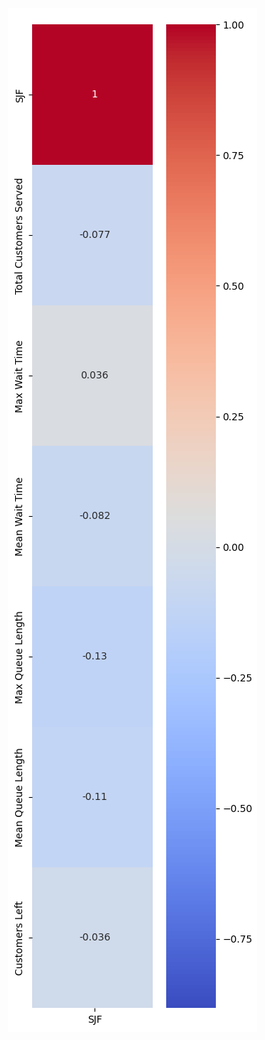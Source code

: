 \documentclass[10pt,twocolumn]{article}
\begin{document}
\begin{figure}
	\centering
	\includegraphics[width=0.7\linewidth]{./heatmap}
	\caption{}
	\label{fig:heatmap}
\end{figure}
\end{document}
